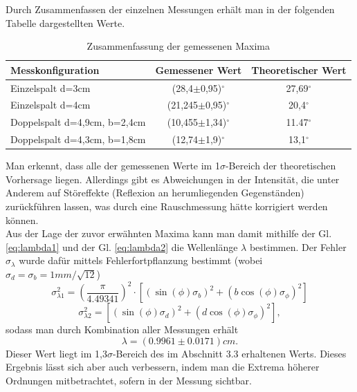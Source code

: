 \documentclass[12pt,a4paper]{article}
\begin{document}
Durch Zusammenfassen der einzelnen Messungen erhält man in der folgenden Tabelle dargestellten Werte.\\
\begin{table}[H]
	\centering
	\begin{tabular}{|l|c|c|}
		\hline 
		Messkonfiguration& Gemessener Wert & Theoretischer Wert \\ 
		\hline 
		Einzelspalt d=3cm &(28,4$\pm$0,95)$^\circ$&27,69$^\circ$ \\ 
		\hline 
		Einzelspalt d=4cm &(21,245$\pm$0,95)$^\circ$ &20,4$^\circ$ \\ 
		\hline 
		Doppelspalt d=4,9cm, b=2,4cm&(10,455$\pm$1,34)$^\circ$ &11.47$^\circ$ \\ 
		\hline 
		Doppelspalt d=4,3cm, b=1,8cm&(12,74$\pm$1,9)$^\circ$ &13,1$^\circ$ \\
		\hline 
	\end{tabular}
	\caption{Zusammenfassung der gemessenen Maxima}
\end{table}
Man erkennt, dass alle der gemessenen Werte im 1$\sigma$-Bereich der theoretischen Vorhersage liegen. Allerdings gibt es Abweichungen in der Intensität, die unter Anderem auf Störeffekte (Reflexion an herumliegenden Gegenständen) zurückführen lassen, was durch eine Rauschmessung hätte korrigiert werden können.\\
Aus der Lage der zuvor erwähnten Maxima kann man damit mithilfe der Gl. \ref{eq:lambda1} und der Gl. \ref{eq:lambda2} die Wellenlänge $\lambda$ bestimmen. Der Fehler $\sigma_\lambda$ wurde dafür mittels Fehlerfortpflanzung bestimmt (wobei $\sigma_d=\sigma_b=1mm/\sqrt{12}$)
\begin{equation*}
	\sigma_{\lambda 1}^2 = \left(\frac{\pi}{4.49341}\right)^2 \cdot \left[(\sin(\phi)\sigma_b)^2+(b\cos(\phi)\sigma_\phi)^2\right]
\end{equation*}
\begin{equation*}
	\sigma_{\lambda {2}}^2 = \left[(\sin(\phi)\sigma_d)^2+(d\cos(\phi)\sigma_\phi)^2\right],
\end{equation*}
sodass man durch Kombination aller Messungen erhält
\begin{equation}
	\lambda = (0.9961 \pm 0.0171) cm.
\end{equation}
Dieser Wert liegt im 1,3$\sigma$-Bereich des im Abschnitt 3.3 erhaltenen Werts. Dieses Ergebnis lässt sich aber auch verbessern, indem man die Extrema höherer Ordnungen mitbetrachtet, sofern in der Messung sichtbar.
\end{document}
